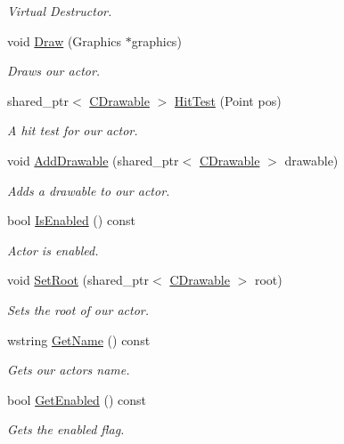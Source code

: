 \begin{DoxyCompactItemize}
\begin{DoxyCompactList}\small\item\em Virtual Destructor. \end{DoxyCompactList}\item 
void \hyperlink{class_c_actor_add04012d09640195e7dd0f98d80c5bfe}{Draw} (Graphics $\ast$graphics)
\begin{DoxyCompactList}\small\item\em Draws our actor. \end{DoxyCompactList}\item 
shared\+\_\+ptr$<$ \hyperlink{class_c_drawable}{C\+Drawable} $>$ \hyperlink{class_c_actor_a3afe52edb79961f1eb90c82b931ca766}{Hit\+Test} (Point pos)
\begin{DoxyCompactList}\small\item\em A hit test for our actor. \end{DoxyCompactList}\item 
void \hyperlink{class_c_actor_a338b3d46841013baea7f86fdb6f58dc7}{Add\+Drawable} (shared\+\_\+ptr$<$ \hyperlink{class_c_drawable}{C\+Drawable} $>$ drawable)
\begin{DoxyCompactList}\small\item\em Adds a drawable to our actor. \end{DoxyCompactList}\item 
bool \hyperlink{class_c_actor_ab3e78932aeb9e2a764670bc82ac85094}{Is\+Enabled} () const 
\begin{DoxyCompactList}\small\item\em Actor is enabled. \end{DoxyCompactList}\item 
void \hyperlink{class_c_actor_a385a9ac85a6e0f5c0cb2f96109f26ae4}{Set\+Root} (shared\+\_\+ptr$<$ \hyperlink{class_c_drawable}{C\+Drawable} $>$ root)
\begin{DoxyCompactList}\small\item\em Sets the root of our actor. \end{DoxyCompactList}\item 
wstring \hyperlink{class_c_actor_a043ed1819e96171b06a916e5891e953f}{Get\+Name} () const 
\begin{DoxyCompactList}\small\item\em Gets our actors name. \end{DoxyCompactList}\item 
bool \hyperlink{class_c_actor_a54ef050d02a6d25f5bfc8ca9b09f18bf}{Get\+Enabled} () const 
\begin{DoxyCompactList}\small\item\em Gets the enabled flag. \end{DoxyCompactList}\item 

\end{DoxyCompactItemize}
